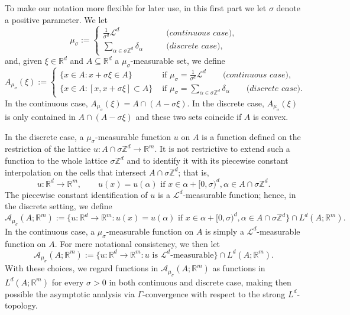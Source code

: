 \documentclass{article}
\theoremstyle{plain}
\theoremstyle{definition}
\def\rr{{\mathbb R}}
\def\ZZ{{\mathbb Z}}
\def\ms{\mu_\sigma}
\newcommand{\s}{\sigma}
\numberwithin{equation}{section}
\begin{document}
To make our notation more flexible for later use, in this first part we let $\s$ denote a positive parameter. We let
\begin{equation*}
    \ms:=\begin{cases}
        \displaystyle\frac{1}{\s^d}\mathcal{L}^d & \qquad  \textit{(continuous case),} \\[7pt]
        \displaystyle\sum_{\alpha\in \s\ZZ^d}\delta_\alpha & \qquad \textit{(discrete case),}
    \end{cases}
\end{equation*}
and, given $\xi \in \mathbb{R}^{d}$ and $A\subseteq \rr^d$ a $\ms$-measurable set, we define 
\begin{equation}
    A_{\ms}(\xi):=\begin{cases}
        \{x\in A: x+\s\xi \in A\} & \text{ if } \ms=\displaystyle\frac{1}{\s^d}\mathcal{L}^d \qquad  \textit{(continuous case),} \\[7pt]
        \{x\in A: [x,x+\s\xi]\subset A\} & \text{ if } \displaystyle \ms=\sum_{\alpha\in \s\ZZ^d}\delta_\alpha  \qquad \textit{(discrete case).}
    \end{cases}
    \label{set}
\end{equation}
 In the continuous case, $A_{\ms}({\xi})=A\cap(A-\s\xi)$. In the discrete case, $A_{\ms}(\xi)$ is only contained in $A\cap(A-\s\xi)$ and these two sets coincide if $A$ is convex. 

 In the discrete case, a $\ms$-measurable function $u$ on $A$ is a function defined on the restriction of the lattice $u:A\cap\s\ZZ^d\to \rr^m$. It is not restrictive to extend such a function to the whole lattice $\s\ZZ^d$ and to identify it with its piecewise constant interpolation on the cells that intersect $A\cap\s\ZZ^d$; that is,
 \begin{equation*}
     u: \mathbb{R}^d\rightarrow \mathbb{R}^{m}, \qquad u(x)=u(\alpha) \text{ if } x\in \alpha +[0,\s)^{d},\alpha \in A\cap \s\ZZ^d.
 \end{equation*}
 The piecewise constant identification of $u$ is a $\mathcal{L}^d$-measurable function; hence, in the discrete setting, we define 
\begin{equation*}
    \mathcal{A}_{\ms}(A;\mathbb{R}^{m}):=\{u: \mathbb{R}^d\rightarrow \mathbb{R}^{m}: u(x)=u(\alpha) \text{ if } x\in \alpha +[0,\s)^{d},\alpha \in A\cap \s\ZZ^d \}\cap L^d(A;\rr^m).
\end{equation*}
In the continuous case, a $\ms$-measurable function on $A$ is simply a $\mathcal{L}^d$-measurable function on $A$. For mere notational consistency, we then let
\begin{equation*}
    \mathcal{A}_{\ms}(A;\mathbb{R}^{m}):=\{u:\rr^d\to\rr^m: u \text{ is }\mathcal{L}^d\text{-measurable}\}\cap L^d(A;\rr^m).
\end{equation*}
With these choices, we regard functions in  $\mathcal{A}_{\ms}(A;\mathbb{R}^{m})$ as functions in $L^d(A;\rr^m)$ for every $\s>0$ in both continuous and discrete case, making then possible the asymptotic analysis via $\Gamma$-convergence with respect to the strong $L^d$-topology. 
\end{document}
